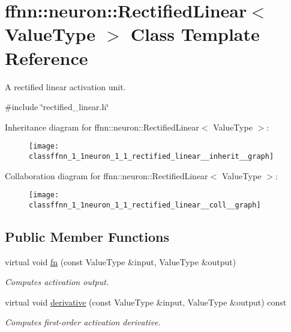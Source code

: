 \hypertarget{classffnn_1_1neuron_1_1_rectified_linear}{\section{ffnn\-:\-:neuron\-:\-:Rectified\-Linear$<$ Value\-Type $>$ Class Template Reference}
\label{classffnn_1_1neuron_1_1_rectified_linear}
}


A rectified linear activation unit.  




{\ttfamily \#include \char`\"{}rectified\-\_\-linear.\-h\char`\"{}}



Inheritance diagram for ffnn\-:\-:neuron\-:\-:Rectified\-Linear$<$ Value\-Type $>$\-:\nopagebreak
\begin{figure}[H]
\begin{center}
\leavevmode
\texttt{[image: classffnn\_1\_1neuron\_1\_1\_rectified\_linear\_\_inherit\_\_graph]}
\end{center}
\end{figure}


Collaboration diagram for ffnn\-:\-:neuron\-:\-:Rectified\-Linear$<$ Value\-Type $>$\-:\nopagebreak
\begin{figure}[H]
\begin{center}
\leavevmode
\texttt{[image: classffnn\_1\_1neuron\_1\_1\_rectified\_linear\_\_coll\_\_graph]}
\end{center}
\end{figure}
\subsection*{Public Member Functions}
\begin{DoxyCompactItemize}
\item 
virtual void \hyperlink{classffnn_1_1neuron_1_1_rectified_linear_aa6f5d5fab4b2468fa36e208ed885782c}{fn} (const Value\-Type \&input, Value\-Type \&output)
\begin{DoxyCompactList}\small\item\em Computes activation output. \end{DoxyCompactList}\item 
virtual void \hyperlink{classffnn_1_1neuron_1_1_rectified_linear_a8c45f64142bf994a96f4987cdd81e32f}{derivative} (const Value\-Type \&input, Value\-Type \&output) const 
\begin{DoxyCompactList}\small\item\em Computes first-\/order activation derivative. \end{DoxyCompactList}\end{DoxyCompactItemize}


